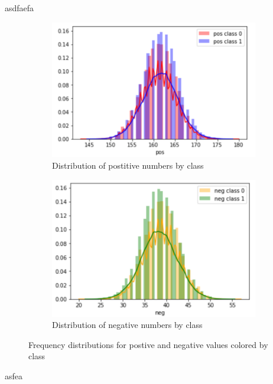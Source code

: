 \documentclass[11pt,letterpaper]{article}
\begin{document}
asdfaefa

\begin{figure}[h!]
    \centering
    \begin{subfigure}[]{.4\textwidth}
        \includegraphics[width=\textwidth]{pos_dist.png}
        \caption{Distribution of postitive numbers by class}
        \label{fig:pos_dist}
    \end{subfigure}
    \begin{subfigure}[]{.4\textwidth}
        \includegraphics[width=\textwidth]{neg_dist.png}
        \caption{Distribution of negative numbers by class}
        \label{fig:neg_dist}
    \end{subfigure}
    \caption{Frequency distributions for postive and negative values colored by
class}
    \label{fig:count_dist}
\end{figure}

asfea
\end{document}
